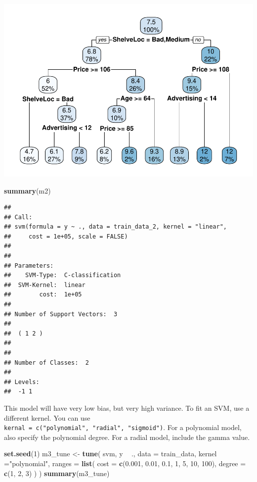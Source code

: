 \documentclass[]{book}
\newenvironment{Shaded}{\begin{snugshade}}{\end{snugshade}}
\newcommand{\DataTypeTok}[1]{\textcolor[rgb]{0.13,0.29,0.53}{#1}}
\newcommand{\DecValTok}[1]{\textcolor[rgb]{0.00,0.00,0.81}{#1}}
\newcommand{\FloatTok}[1]{\textcolor[rgb]{0.00,0.00,0.81}{#1}}
\newcommand{\KeywordTok}[1]{\textcolor[rgb]{0.13,0.29,0.53}{\textbf{#1}}}
\newcommand{\NormalTok}[1]{#1}
\newcommand{\OperatorTok}[1]{\textcolor[rgb]{0.81,0.36,0.00}{\textbf{#1}}}
\newcommand{\StringTok}[1]{\textcolor[rgb]{0.31,0.60,0.02}{#1}}
\begin{document}
\includegraphics{data-sci_files/figure-latex/unnamed-chunk-101-1.pdf}

\begin{Shaded}
\begin{Highlighting}[]
\KeywordTok{summary}\NormalTok{(m2)}
\end{Highlighting}
\end{Shaded}

\begin{verbatim}
## 
## Call:
## svm(formula = y ~ ., data = train_data_2, kernel = "linear", 
##     cost = 1e+05, scale = FALSE)
## 
## 
## Parameters:
##    SVM-Type:  C-classification 
##  SVM-Kernel:  linear 
##        cost:  1e+05 
## 
## Number of Support Vectors:  3
## 
##  ( 1 2 )
## 
## 
## Number of Classes:  2 
## 
## Levels: 
##  -1 1
\end{verbatim}

This model will have very low bias, but very high variance. To fit an SVM, use a different kernel. You can use \texttt{kernal\ =\ c("polynomial",\ "radial",\ "sigmoid")}. For a polynomial model, also specify the polynomial degree. For a radial model, include the gamma value.

\begin{Shaded}
\begin{Highlighting}[]
\KeywordTok{set.seed}\NormalTok{(}\DecValTok{1}\NormalTok{)}
\NormalTok{m3_tune <-}\StringTok{ }\KeywordTok{tune}\NormalTok{(}
\NormalTok{  svm,}
\NormalTok{  y }\OperatorTok{~}\StringTok{ }\NormalTok{.,}
  \DataTypeTok{data =}\NormalTok{ train_data,}
  \DataTypeTok{kernel =}\StringTok{"polynomial"}\NormalTok{,}
  \DataTypeTok{ranges =} \KeywordTok{list}\NormalTok{(}
    \DataTypeTok{cost =} \KeywordTok{c}\NormalTok{(}\FloatTok{0.001}\NormalTok{, }\FloatTok{0.01}\NormalTok{, }\FloatTok{0.1}\NormalTok{, }\DecValTok{1}\NormalTok{, }\DecValTok{5}\NormalTok{, }\DecValTok{10}\NormalTok{, }\DecValTok{100}\NormalTok{),}
    \DataTypeTok{degree =} \KeywordTok{c}\NormalTok{(}\DecValTok{1}\NormalTok{, }\DecValTok{2}\NormalTok{, }\DecValTok{3}\NormalTok{)}
\NormalTok{  )}
\NormalTok{)}
\KeywordTok{summary}\NormalTok{(m3_tune)}
\end{Highlighting}
\end{Shaded}
\end{document}
